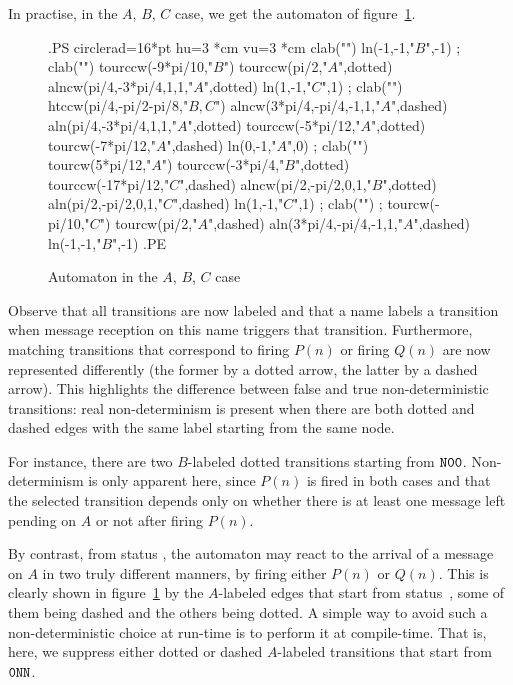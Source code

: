 In practise, in the $A$, $B$, $C$ case, we get the
automaton of figure~\ref{abc}.
\begin{figure}[th]
\begin{toimage}
.PS
circlerad=16*pt
hu=3 *cm
vu=3 *cm
clab("")
{ln(-1,-1,"$B$",-1) ; clab("")
  tourccw(-9*pi/10,"$B$")
  tourccw(pi/2,"$A$",dotted)
  {alncw(pi/4,-3*pi/4,1,1,"$A$",dotted)}
  {ln(1,-1,"$C$",1) ; clab("")
    htccw(pi/4,-pi/2-pi/8,"$B, C$")
    {alncw(3*pi/4,-pi/4,-1,1,"$A$",dashed)}
    {aln(pi/4,-3*pi/4,1,1,"$A$",dotted)}
    tourccw(-5*pi/12,"$A$",dotted)
    tourcw(-7*pi/12,"$A$",dashed)
}}
{ln(0,-1,"$A$",0) ; clab("")
  tourcw(5*pi/12,"$A$")
  tourccw(-3*pi/4,"$B$",dotted)
  tourccw(-17*pi/12,"$C$",dashed)
  {alncw(pi/2,-pi/2,0,1,"$B$",dotted)}
  {aln(pi/2,-pi/2,0,1,"$C$",dashed)}
}
{ln(1,-1,"$C$",1) ; clab("") ;
  tourcw(-pi/10,"$C$")
  tourcw(pi/2,"$A$",dashed)
  {aln(3*pi/4,-pi/4,-1,1,"$A$",dashed)}
  {ln(-1,-1,"$B$",-1)}}
.PE
\end{toimage}
\showgraph
\caption{\label{abc} Automaton in the $A$, $B$, $C$ case}
\end{figure}

Observe that all transitions are now labeled and that a name labels a
transition when message reception on this name triggers that
transition.  Furthermore, matching transitions that correspond to
firing $P(n)$ or firing $Q(n)$ are now represented differently (the
former by a dotted arrow, the latter by a dashed arrow).  This
highlights the difference between false and true non-deterministic
transitions: real non-determinism is present when there are both
dotted and dashed edges with the same label starting from the same
node.

For instance, there are two $B$-labeled dotted transitions starting
from ${\tt N00}$.  Non-determinism is only apparent here, since
$P(n)$ is fired in both cases and that the selected transition depends
only on whether there is at least one message left pending on $A$
or not after firing $P(n)$.


By contrast, from status , the automaton may react to the
arrival of a message on $A$ in two truly different manners, by firing
either $P(n)$ or $Q(n)$.  This is clearly shown in figure~\ref{abc} by
the  $A$-labeled edges that start from status~, some of
them being dashed and the others being dotted.  A simple way to avoid
such a non-deterministic choice at run-time is to perform it at
compile-time.  That is, here, we suppress either dotted or dashed
$A$-labeled transitions that start from ${\tt 0NN}$.

